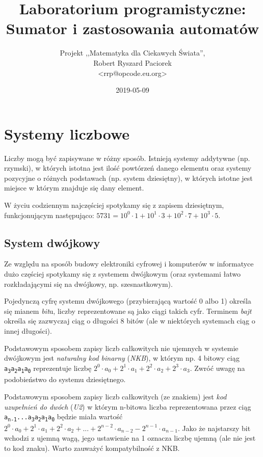 \documentclass{pdfBooklets}
\title{Laboratorium programistyczne:\\ Sumator i zastosowania automatów}
\author{%
	Projekt ,,Matematyka dla Ciekawych Świata'',\\
	Robert Ryszard Paciorek\\\normalsize\ttfamily <rrp@opcode.eu.org>
}
\date  {2019-05-09}
\begin{document}
\maketitle

\section{Systemy liczbowe}

Liczby mogą być zapisywane w różny sposób. Istnieją systemy addytywne (np. rzymski), w których istotna jest ilość powtórzeń danego elementu oraz systemy pozycyjne o różnych podstawach (np. system dziesiętny), w których istotne jest miejsce w którym znajduje się dany element.

W życiu codziennym najczęściej spotykamy się z zapisem dziesiętnym, funkcjonującym następująco: $5731 = 10^0 \cdot 1 + 10^1 \cdot 3 + 10^2 \cdot 7 + 10^3 \cdot 5$.

\subsection{System dwójkowy}

Ze względu na sposób budowy elektroniki cyfrowej i komputerów w informatyce dużo częściej spotykamy się z systemem dwójkowym (oraz systemami łatwo rozkładającymi się na dwójkowy, np. szesnastkowym).

Pojedynczą cyfrę systemu dwójkowego (przybierającą wartość 0 albo 1) określa się mianem \emph{bit}u, liczby reprezentowane są jako ciągi takich cyfr. Terminem \emph{bajt} określa się zazwyczaj ciąg o długości 8 bitów (ale w niektórych systemach ciąg o innej długości).

Podstawowym sposobem zapisy liczb całkowitych nie ujemnych w systemie dwójkowym jest \emph{naturalny kod binarny} (\emph{NKB}), w którym np. 4 bitowy ciąg {\tt a\textsubscript{3}a\textsubscript{2}a\textsubscript{1}a\textsubscript{0}} reprezentuje liczbę $2^0 \cdot a_0 + 2^1 \cdot a_1 + 2^2 \cdot a_2 + 2^3 \cdot a_3$. Zwróć uwagę na podobieństwo do systemu dziesiętnego.

Podstawowym sposobem zapisy liczb całkowitych (ze znakiem) jest \emph{kod uzupełnień do dwóch} (\emph{U2}) w którym n-bitowa liczba reprezentowana przez ciąg {\tt a\textsubscript{n-1}...a\textsubscript{3}a\textsubscript{2}a\textsubscript{1}a\textsubscript{0}} będzie miała wartość $2^0 \cdot a_0 + 2^1 \cdot a_1 + 2^2 \cdot a_2 + ... + 2^{n-2} \cdot a_{n-2} - 2^{n-1} \cdot a_{n-1}$. Jako że najstarszy bit wchodzi z ujemną wagą, jego ustawienie na 1 oznacza liczbę ujemną (ale nie jest to kod znaku). Warto zauważyć kompatybilność z NKB.
\end{document}
